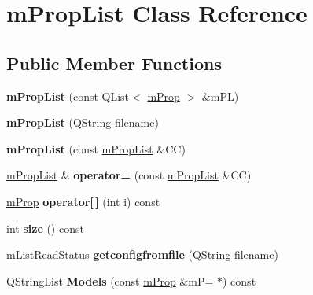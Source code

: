 \hypertarget{classm_prop_list}{}\section{m\+Prop\+List Class Reference}
\label{classm_prop_list}
\subsection*{Public Member Functions}
\begin{DoxyCompactItemize}
\item 
\mbox{\label{classm_prop_list_a4494e67edb24b82909d64ca0b510c391}} 
{\bfseries m\+Prop\+List} (const Q\+List$<$ \hyperlink{classm_prop}{m\+Prop} $>$ \&m\+PL)
\item 
\mbox{\label{classm_prop_list_a98eac1373887b76ecf411f4418a08718}} 
{\bfseries m\+Prop\+List} (Q\+String filename)
\item 
\mbox{\label{classm_prop_list_a1ec0832019c46f729985c7513856ae1e}} 
{\bfseries m\+Prop\+List} (const \hyperlink{classm_prop_list}{m\+Prop\+List} \&CC)
\item 
\mbox{\label{classm_prop_list_a29fbe7350e2447acbfbbdd90cb99fb71}} 
\hyperlink{classm_prop_list}{m\+Prop\+List} \& {\bfseries operator=} (const \hyperlink{classm_prop_list}{m\+Prop\+List} \&CC)
\item 
\mbox{\label{classm_prop_list_a85165e53faa93860a39bbe47cb1021d2}} 
\hyperlink{classm_prop}{m\+Prop} {\bfseries operator\mbox{[}$\,$\mbox{]}} (int i) const
\item 
\mbox{\label{classm_prop_list_a5da42f310eb77f0470b99fccad1e18aa}} 
int {\bfseries size} () const
\item 
\mbox{\label{classm_prop_list_aecbcfe7a86af5c94082899fa350385a0}} 
m\+List\+Read\+Status {\bfseries getconfigfromfile} (Q\+String filename)
\item 
\mbox{\label{classm_prop_list_a1f42392ff16928386234a15f0cc0b991}} 
Q\+String\+List {\bfseries Models} (const \hyperlink{classm_prop}{m\+Prop} \&mP=\textquotesingle{} $\ast$\textquotesingle{}) const

\end{DoxyCompactItemize}
